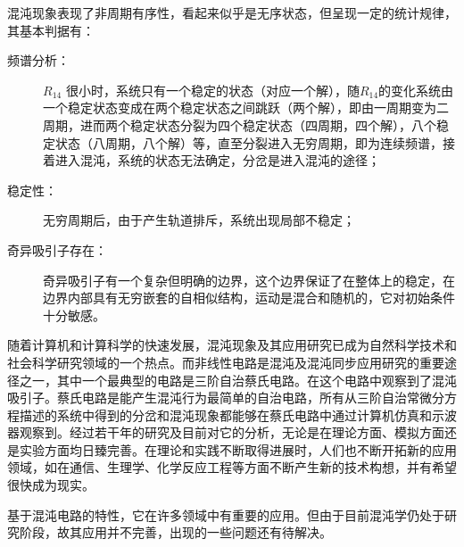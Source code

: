 \documentclass{article}
\begin{document}
混沌现象表现了非周期有序性，看起来似乎是无序状态，但呈现一定的统计规律，其基本判据有：

\begin{description}
	\item[频谱分析：]\( R_{14} \) 很小时，系统只有一个稳定的状态（对应一个解），随\( R_{14} \)的变化系统由一个稳定状态变成在两个稳定状态之间跳跃（两个解），即由一周期变为二周期，进而两个稳定状态分裂为四个稳定状态（四周期，四个解），八个稳定状态（八周期，八个解）等，直至分裂进入无穷周期，即为连续频谱，接着进入混沌，系统的状态无法确定，分岔是进入混沌的途径；
	\item[稳定性：]无穷周期后，由于产生轨道排斥，系统出现局部不稳定；
	\item[奇异吸引子存在：]奇异吸引子有一个复杂但明确的边界，这个边界保证了在整体上的稳定，在边界内部具有无穷嵌套的自相似结构，运动是混合和随机的，它对初始条件十分敏感。
\end{description}

随着计算机和计算科学的快速发展，混沌现象及其应用研究已成为自然科学技术和社会科学研究领域的一个热点。而非线性电路是混沌及混沌同步应用研究的重要途径之一，其中一个最典型的电路是三阶自治蔡氏电路。在这个电路中观察到了混沌吸引子。蔡氏电路是能产生混沌行为最简单的自治电路，所有从三阶自治常微分方程描述的系统中得到的分岔和混沌现象都能够在蔡氏电路中通过计算机仿真和示波器观察到。经过若干年的研究及目前对它的分析，无论是在理论方面、模拟方面还是实验方面均日臻完善。在理论和实践不断取得进展时，人们也不断开拓新的应用领域，如在通信、生理学、化学反应工程等方面不断产生新的技术构想，并有希望很快成为现实。

基于混沌电路的特性，它在许多领域中有重要的应用。但由于目前混沌学仍处于研究阶段，故其应用并不完善，出现的一些问题还有待解决。
\end{document}
